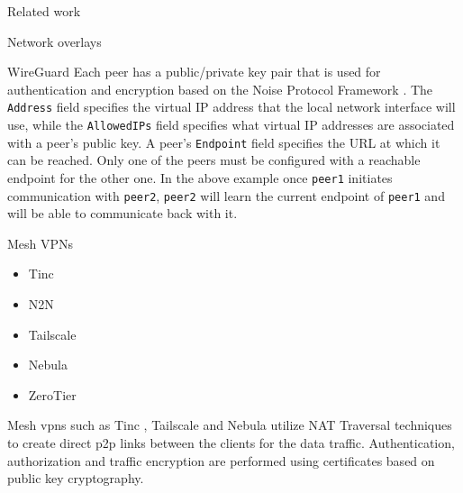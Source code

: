 \begin{frame}[fragile]{Related work}
\begin{block}{Network overlays}
\begin{block}{WireGuard}
Each peer has a public/private key pair that is used for authentication
and encryption based on the Noise Protocol Framework
\autocite{noiseDocs}. The \texttt{Address} field specifies the virtual
IP address that the local network interface will use, while the
\texttt{AllowedIPs} field specifies what virtual IP addresses are
associated with a peer's public key. A peer's \texttt{Endpoint} field
specifies the URL at which it can be reached. Only one of the peers must
be configured with a reachable endpoint for the other one. In the above
example once \texttt{peer1} initiates communication with \texttt{peer2},
\texttt{peer2} will learn the current endpoint of \texttt{peer1} and
will be able to communicate back with it.
\end{block}

\begin{block}{Mesh VPNs}
\protect\hypertarget{thesis__020-related-work.md__mesh-vpns}{}
\begin{itemize}
\tightlist
\item
  Tinc
\item
  N2N
\item
  Tailscale
\item
  Nebula
\item
  ZeroTier
\end{itemize}

Mesh \glspl{vpn} such as Tinc \autocite{tincDocs}, Tailscale
\autocite{tailscaleDocs} and Nebula \autocite{nebulaDocs} utilize NAT
Traversal techniques to create direct \gls{p2p} links between the
clients for the data traffic. Authentication, authorization and traffic
encryption are performed using certificates based on public key
cryptography.


\end{block}
\end{block}
\end{frame}
